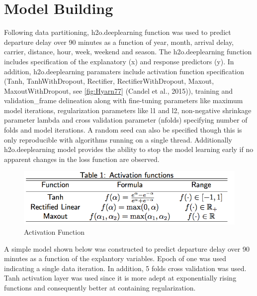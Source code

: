 \documentclass[12pt,twoside]{amherstthesis}
\begin{document}
  \clearpage 
  
  \section{Model Building}\label{model-building}
  
  Following data partitioning, h2o.deeplearning function was used to
  predict departure delay over 90 minutes as a function of year, month,
  arrival delay, carrier, distance, hour, week, weekend and season. The
  h2o.deeplearning function includes specification of the explanatory (x)
  and response predictors (y). In addition, h2o.deeplearning paramaters
  include activation function specification (Tanh, TanhWithDropout,
  Rectifier, RectifierWithDropout, Maxout, MaxoutWithDropout, see
  \autoref{fig:Hyarn77} (Candel et al., 2015)), training and
  validation\_frame delineation along with fine-tuning parameters like
  maximum model iterations, regularization parameters like l1 and l2,
  non-negative shrinkage parameter lambda and cross validation parameter
  (nfolds) specifying number of folds and model iterations. A random seed
  can also be specified though this is only reproducible with algorithms
  running on a single thread. Additionally h2o.deeplearning model provides
  the ability to stop the model learning early if no apparent changes in
  the loss function are observed.
  
  \begin{figure}[htbp]
  \centering
  \includegraphics[scale = 0.5,angle = 0]{figure/activationFunc.png}
  \caption[Activation Function]{\normalsize{Activation Function}}
  \label{fig:Hyarn77}
  \end{figure}
  
  A simple model shown below was constructed to predict departure delay
  over 90 minutes as a function of the explantory variables. Epoch of one
  was used indicating a single data iteration. In addition, 5 folds cross
  validation was used. Tanh activation layer was used since it is more
  adept at exponentially rising functions and consequently better at
  containing regularization.
  
\end{document}
